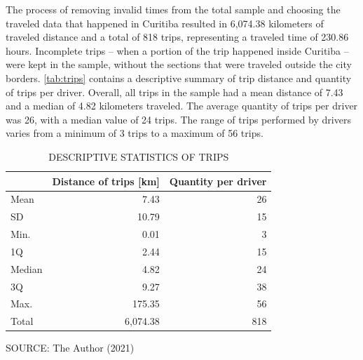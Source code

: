 The process of removing invalid times from the total sample and choosing the traveled data that happened in Curitiba resulted in 6,074.38 kilometers of traveled distance and a total of 818 trips, representing a traveled time of 230.86 hours. Incomplete trips – when a portion of the trip happened inside Curitiba – were kept in the sample, without the sections that were traveled outside the city borders. \autoref{tab:trips} contains a descriptive summary of trip distance and quantity of trips per driver. Overall, all trips in the sample had a mean distance of 7.43 and a median of 4.82 kilometers traveled. The average quantity of trips per driver was 26, with a median value of 24 trips. The range of trips performed by drivers varies from a minimum of 3 trips to a maximum of 56 trips. 

\begin{table}[!htbp]
    \footnotesize
    \captionsetup{justification=raggedright, singlelinecheck=false,
    font=footnotesize}
    \caption{DESCRIPTIVE STATISTICS OF TRIPS}
    \centering
    \begin{tabular}{lrr}
        \hline
         & \multicolumn{1}{c}{\textbf{Distance of trips [km]}} & \multicolumn{1}{c}{\textbf{Quantity per driver}} \\
        \hline
        Mean   &     7.43 & 26 \\
        SD     &    10.79 & 15 \\
        Min.   &     0.01 &  3 \\
        1Q     &     2.44 & 15 \\
        Median &     4.82 & 24 \\
        3Q     &     9.27 & 38 \\
        Max.   &   175.35 & 56 \\
        \hline
        Total  & 6,074.38 & 818 \\
        \hline
    \end{tabular}
    \label{tab:trips}
    \par \vspace{2mm} \footnotesize \raggedright
    SOURCE: The Author (2021)
\end{table}

